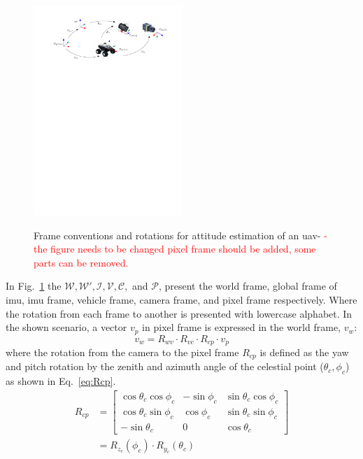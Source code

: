 \begin{figure}[h]
  \centering
  \includegraphics[width=0.5\textwidth]{./content/intro/figures/conventions.pdf}
  \label{fig:rotation}
  \caption{Frame conventions and rotations for attitude estimation of an
    \gls{uav}- \textcolor{red}{-the figure needs to be changed pixel frame
    should be added, some parts can be removed.}}
\end{figure}
In Fig.~\ref{fig:rotation} the $\mathcal{W}, \mathcal{W'}, \mathcal{I},
\mathcal{V}, \mathcal{C},$ and $\mathcal{P}$, present the world frame, global
frame of \gls{imu}, \gls{imu} frame, vehicle frame, camera frame, and pixel
frame respectively. Where the rotation from each frame to another is presented
with lowercase alphabet.
In the shown scenario, a vector $v_{p}$ in pixel frame is
expressed in the world frame, $v_{w}$:
\begin{equation}
  \label{eq:vinW}
  v_{w} = R_{wv} \cdot R_{vc} \cdot R_{cp} \cdot v_{p}
\end{equation}
\noindent where the rotation from the camera to the pixel frame $R_{cp}$ is
defined as the yaw and pitch rotation by the zenith and azimuth angle of the
celestial point ($\theta_c, \phi_c$) as shown in Eq.~\ref{eq:Rcp}.
\begin{equation}
  \label{eq:Rcp}
  \begin{split}
  R_{cp}  & =
  \begin{bmatrix}
    \cos\theta_{c}\cos\phi_{c} & -\sin\phi_{c} & \sin\theta_{c}\cos\phi_{c}\\
    \cos\theta_{c}\sin\phi_{c} & \cos\phi_{c} & \sin\theta_{c}\sin\phi_{c}\\
    -\sin\theta_{c} & 0 & \cos\theta_{c}
  \end{bmatrix}
  \\
  & = R_{z_{c}}(\phi_{c})\cdot R_{y_{c}}(\theta_{c})
  \end{split}
\end{equation}

